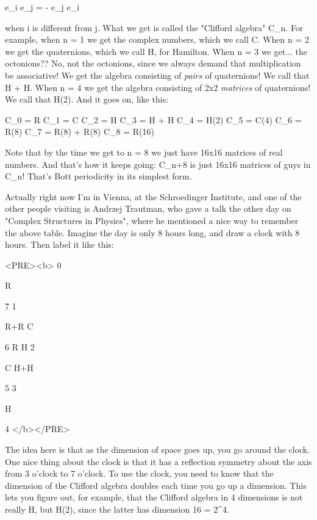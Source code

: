 e_{i} e_{j} = - e_{j} e_{i}

when i is different from j.  What we get is called the "Clifford
algebra" C_{n}.  For example, when n = 1 we get the complex numbers,
which we call C.  When n = 2 we get the quaternions, which we call H,
for Hamilton.  When n = 3 we get... the octonions??  No, not the
octonions, since we always demand that multiplication be associative!
We get the algebra consisting of \emph{pairs} of quaternions!  We call that
H + H.  When n = 4 we get the algebra consisting of 2x2 \emph{matrices} of
quaternions!  We call that H(2).  And it goes on, like this:

C_{0} = R
C_{1} =  C
C_{2} = H
C_{3} = H + H
C_{4} =  H(2)
C_{5} = C(4)
C_{6} = R(8)
C_{7} = R(8) + R(8)
C_{8} = R(16)

Note that by the time we get to n = 8 we just have 16x16 matrices of
real numbers.  And that's how it keeps going: C_{n+8} is just 16x16
matrices of guys in C_{n}!  That's Bott periodicity in its simplest form.

Actually right now I'm in Vienna, at the Schroedinger Institute, and
one of the other people visiting is Andrzej Trautman, who gave a talk
the other day on "Complex Structures in Physics", where he mentioned a
nice way to remember the above table.  Imagine the day is only 8 hours
long, and draw a clock with 8 hours.  Then label it like this:

                        
<PRE><b>
                                    0
                                 
                                    R

                 7                                    1
                                                   
                   R+R                             C





             6   R                                       H   2
 




                    C                             H+H
                 
                  5                                    3

                                    H

                                    4
</b></PRE>


The idea here is that as the dimension of space goes up, you go around
the clock.  One nice thing about the clock is that it has a reflection
symmetry about the axis from 3 o'clock to 7 o'clock.  To use the
clock, you need to know that the dimension of the Clifford algebra
doubles each time you go up a dimension.  This lets you figure out,
for example, that the Clifford algebra in 4 dimensions is not really
H, but H(2), since the latter has dimension 16 = 2^{4}.

